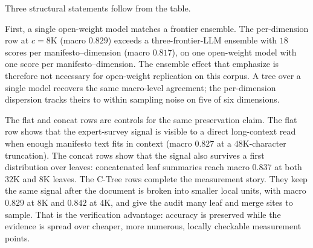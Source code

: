 \begin{table}[htbp]
    \centering
    \resizebox{\linewidth}{!}{}
    \caption{Pearson $r$ against Benoit expert-survey means across six
    policy dimensions. The first block reproduces
    \citet{BenoitEtAl2025}'s published numbers (Fig.~1 proprietary
    ensemble, Tab.~3 split-expert reference, Tab.~6 open-weight
    replication at Gemma-3-27B). The Table~3 row is an empirical
    agreement reference, not a theoretical limit. The remaining
    blocks are C-TreePO on Gemma-4-31B-NVFP4 across chunk sizes $c$,
    under the per-dimension
    and joint variants. The macro column is the unweighted mean
    across dimensions for each row. Full per-cell table with
    coverage, ablations, and compute accounting appears in
    Appendix~\ref{app:benoit-replication}.}\label{tab:benoit-headline}
\end{table}

Three structural statements follow from the table.

First, a single open-weight model matches a frontier ensemble. The per-dimension row at $c = 8\mathrm{K}$ (macro $0.829$) exceeds a three-frontier-LLM ensemble with $18$ scores per manifesto--dimension (macro $0.817$), on one open-weight model with one score per manifesto--dimension. The ensemble effect that \citet{BenoitEtAl2025} emphasize is therefore not necessary for open-weight replication on this corpus. A tree over a single model recovers the same macro-level agreement; the per-dimension dispersion tracks theirs to within sampling noise on five of six dimensions.

The flat and concat rows are controls for the same preservation claim.
The flat row shows that the expert-survey signal is visible to a direct
long-context read when enough manifesto text fits in context (macro
$0.827$ at a $48\mathrm{K}$-character truncation). The concat rows show
that the signal also survives a first distribution over leaves:
concatenated leaf summaries reach macro $0.837$ at both $32\mathrm{K}$
and $8\mathrm{K}$ leaves. The C-Tree rows complete the measurement
story. They keep the same signal after the document is broken into
smaller local units, with macro $0.829$ at $8\mathrm{K}$ and $0.842$ at
$4\mathrm{K}$, and give the audit many leaf and merge sites to sample.
That is the verification advantage: accuracy is preserved while the
evidence is spread over cheaper, more numerous, locally checkable
measurement points.

